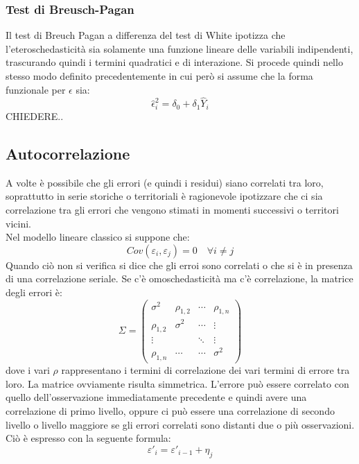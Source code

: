 \documentclass[]{article}
\begin{document}
\subsubsection{Test di Breusch-Pagan}
Il test di Breuch Pagan a differenza del test di White ipotizza che l'eteroschedasticità sia solamente una funzione lineare delle variabili indipendenti, trascurando quindi i termini quadratici e di interazione. Si procede quindi nello stesso modo definito precedentemente in cui però si assume che la forma funzionale per $\epsilon$ sia:
\begin{equation}
	\hat{\epsilon}_i^2 = \delta_0 + \delta_1\hat{Y}_i
\end{equation}
CHIEDERE..
\subsection{Autocorrelazione}
A volte è possibile che gli errori (e quindi i residui) siano correlati tra loro, soprattutto in serie storiche o territoriali è ragionevole ipotizzare che ci sia correlazione tra gli errori che vengono stimati in momenti successivi o territori vicini.\\
Nel modello lineare classico si suppone che:
\begin{equation}
	Cov(\varepsilon_i, \varepsilon_j) = 0 \quad \forall i \neq j
\end{equation}
Quando ciò non si verifica si dice che gli erroi sono correlati o che si è in presenza di una correlazione seriale. Se c'è omoschedasticità ma c'è correlazione, la matrice degli errori è:
\begin{equation}
	\Sigma = \begin{pmatrix}
	\sigma^2 & \rho_{1,2} & \cdots & \rho_{1,n} \\ 
	\rho_{1,2} & \sigma^2 & \cdots & \vdots \\ 
	\vdots &  & \ddots & \vdots \\ 
	\rho_{1,n} & \cdots & \cdots & \sigma^2
	\end{pmatrix} 
\end{equation}
dove i vari $\rho$ rappresentano i termini di correlazione dei vari termini di errore tra loro. La matrice ovviamente risulta simmetrica.
L'errore può essere correlato con quello dell'osservazione immediatamente precedente e quindi avere una correlazione di primo livello, oppure ci può essere una correlazione di secondo livello o livello maggiore se gli errori correlati sono distanti due o più osservazioni. Ciò è espresso con la seguente formula:
\begin{equation}
	\varepsilon'_i = \varepsilon'_{i-1} + \eta_j
\end{equation}
\end{document}
